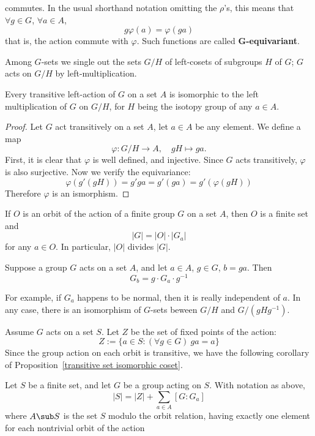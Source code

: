commutes. In the usual shorthand notation omitting the $\rho$'s, this means that $\forall g\in G$, $\forall a\in A$,
\[g\varphi(a)=\varphi(ga)\]
that is, the action commute with $\varphi$. Such functions are called \textbf{$\bm{G}$-equivariant}.\par
Among $G$-sets we single out the sets $G/H$ of left-cosets of subgroups $H$ of $G$; $G$ acts on $G/H$ by left-multiplication.
\begin{proposition}\label{transitive set isomorphic coset}
Every transitive left-action of $G$ on a set $A$ is isomorphic to the left multiplication of $G$ on $G/H$, for $H$ being the isotopy group of any $a\in A$.
\end{proposition}
\begin{proof}
Let $G$ act transitively on a set $A$, let $a\in A$ be any element. We define a map
\[\varphi:G/H\to A,\quad gH\mapsto ga.\]
First, it is clear that $\varphi$ is well defined, and injective. Since $G$ acts transitively, $\varphi$ is also surjective. Now we verify the equivariance:
\[\varphi(g'(gH))=g'ga=g'(ga)=g'(\varphi(gH))\]
Therefore $\varphi$ is an ismorphism.
\end{proof}
\begin{corollary}\label{orbits card}
If $O$ is an orbit of the action of a finite group $G$ on a set $A$, then $O$ is a finite set and
\[|G|=|O|\cdot|G_a|\]
for any $a\in O$. In particular, $|O|$ divides $|G|$.
\end{corollary}
\begin{proposition}\label{group isotopy conjugate relation}
Suppose a group $G$ acts on a set $A$, and let $a\in A$, $g\in G$, $b=ga$. Then
\[G_b=g\cdot G_a\cdot g^{-1}\]
\end{proposition}
For example, if $G_a$ happens to be normal, then it is really independent of $a$. In any case, there is an isomorphism of $G$-sets beween $G/H$ and $G/(gHg^{-1})$.\par
Assume $G$ acts on a set $S$. Let $Z$ be the set of fixed points of the action:
\[Z:=\{a\in S:(\forall g\in G)\ ga=a\}\]
Since the group action on each orbit is transitive, we have the following corollary of Proposition~\ref{transitive set isomorphic coset}.
\begin{proposition}\label{class formula conjugation}
Let $S$ be a finite set, and let $G$ be a group acting on $S$. With
notation as above,
\[|S|=|Z|+\sum_{a\in A}[G:G_a]\]
where $A\sub S$ is the set $S$ modulo the orbit relation, having exactly one element for each nontrivial orbit of the action
\end{proposition}
